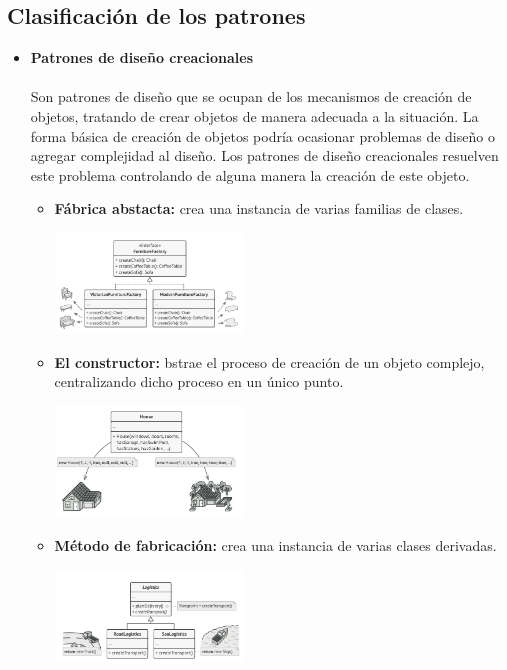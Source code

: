 \documentclass[twoside,twocolumn]{article}
\begin{document}
\subsection{Clasificación de los patrones}
\begin{itemize}
	\item \textbf{Patrones de diseño creacionales}
	\\
	\\Son patrones de diseño que se ocupan de los mecanismos de creación de objetos, tratando de crear objetos de manera adecuada a la situación. La forma básica de creación de objetos podría ocasionar problemas de diseño o agregar complejidad al diseño. Los patrones de diseño creacionales resuelven este problema controlando de alguna manera la creación de este objeto.\cite{Tanembaum2}
	\begin{itemize}
		\item \textbf{Fábrica abstacta:}	crea una instancia de varias familias de clases.
		\begin{center}
			\includegraphics[width=5cm]{./Imagenes/3} 
		\end{center}
		
		\item \textbf{El constructor:} bstrae el proceso de creación de un objeto complejo, centralizando dicho proceso en un único punto.
		\begin{center}
			\includegraphics[width=5cm]{./Imagenes/4} 
		\end{center}
		
		\item \textbf{Método de fabricación:} crea una instancia de varias clases derivadas.
		\begin{center}
			\includegraphics[width=5cm]{./Imagenes/2} 
		\end{center}
		

\end{itemize}
\end{itemize}
\end{document}
